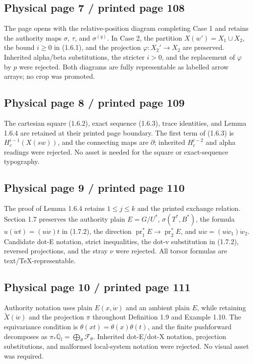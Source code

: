 \documentclass[10pt]{article}
\begin{document}
\subsection*{Physical page 7 / printed page 108}

The page opens with the relative-position diagram completing Case 1 and retains the authority maps \(\sigma\), \(\tau\), and \(\sigma^{(q)}\). In Case 2, the partition \(X(w')=X_1\cup X_2\), the bound \(i\ge 0\) in (1.6.1), and the projection \(\varphi:X_2'\to X_2\) are preserved. Inherited alpha/beta substitutions, the stricter \(i>0\), and the replacement of \(\varphi\) by \(p\) were rejected. Both diagrams are fully representable as labelled arrow arrays; no crop was promoted.\par

\subsection*{Physical page 8 / printed page 109}

The cartesian square (1.6.2), exact sequence (1.6.3), trace identities, and Lemma 1.6.4 are retained at their printed page boundary. The first term of (1.6.3) is \(H_c^{i-1}(X(sw))\), and the connecting maps are \(\partial\); inherited \(H_c^{i-2}\) and alpha readings were rejected. No asset is needed for the square or exact-sequence typography.\par

\subsection*{Physical page 9 / printed page 110}

The proof of Lemma 1.6.4 retains \(1\le j\le k\) and the printed exchange relation. Section 1.7 preserves the authority plain \(E=G/U^*\), \(\sigma(T^*,B^*)\), the formula \(u(\dot w t)=(u\dot w)t\) in (1.7.2), the direction \(\operatorname{pr}_1^*E\to\operatorname{pr}_2^*E\), and \(u\dot w=(u\dot w_1)\dot w_2\). Candidate dot-E notation, strict inequalities, the dot-v substitution in (1.7.2), reversed projections, and the stray \(\nu\) were rejected. All torsor formulas are text/TeX-representable.\par

\subsection*{Physical page 10 / printed page 111}

Authority notation uses plain \(E(x,\dot w)\) and an ambient plain \(E\), while retaining \(\widetilde X(\dot w)\) and the projection \(\pi\) throughout Definition 1.9 and Example 1.10. The equivariance condition is \(\theta(xt)=\theta(x)\theta(t)\), and the finite pushforward decomposes as \(\pi_*\overline{\mathbb Q}_l=\bigoplus_\theta\mathcal F_\theta\). Inherited dot-E/dot-X notation, projection substitutions, and malformed local-system notation were rejected. No visual asset was required.\par
\end{document}
